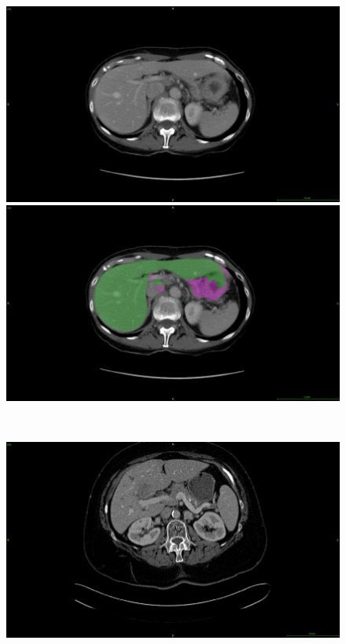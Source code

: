 \documentclass[]{article}
\begin{document}
\begin{figure}[ht!]
	\centering
	\begin{minipage}{0.45\linewidth}
		\includegraphics[width=\linewidth]{../Contributions/images/MisSegmentations/ResizeTCGA-BC-A3KF_slice61_raw}
	\end{minipage} \hspace{-0.1cm}
	\begin{minipage}{0.45\linewidth}
		\includegraphics[width=\linewidth]{../Contributions/images/MisSegmentations/ResizeTCGA-BC-A3KF_slice61_liverPrediction_Cmap}
	\end{minipage} \\
	\begin{minipage}{0.45\linewidth}
		\includegraphics[width=\linewidth]{../Contributions/images/MisSegmentations/ResizeTCGA-BC-A10Z_slice30_raw}

\end{minipage}
\end{figure}
\end{document}
